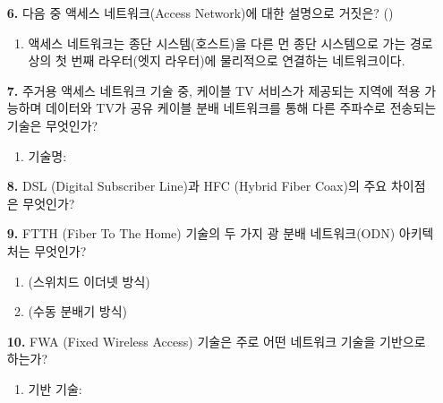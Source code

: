 \documentclass[a4paper, 10pt]{article}
\newcommand{\ansline}[1]{\underline{\hspace{#1}}}
\newcommand{\sectionbox}[1]{
  \vspace{0.5em}
  \noindent\fbox{\textbf{#1}}
  \vspace{0.5em}
}
\begin{document}
\begin{enumerate}[itemsep=2em, leftmargin=2em, label={}]
\item[] \sectionbox{II. 네트워크 엣지 및 접속 네트워크 (5문제)}

\item[\textbf{6.}] 다음 중 액세스 네트워크(Access Network)에 대한 설명으로 거짓은? (\hspace{1cm})
\begin{enumerate}[label={}, itemsep=0.3em, leftmargin=1.5em]
    \item 액세스 네트워크는 종단 시스템(호스트)을 다른 먼 종단 시스템으로 가는 경로상의 첫 번째 라우터(엣지 라우터)에 물리적으로 연결하는 네트워크이다.
\end{enumerate}

\item[\textbf{7.}] 주거용 액세스 네트워크 기술 중, 케이블 TV 서비스가 제공되는 지역에 적용 가능하며 데이터와 TV가 공유 케이블 분배 네트워크를 통해 다른 주파수로 전송되는 기술은 무엇인가?
\begin{enumerate}[label=\alph*., itemsep=0.3em, leftmargin=1.5em]
    \item 기술명: \ansline{5cm}
\end{enumerate}

\item[\textbf{8.}] DSL (Digital Subscriber Line)과 HFC (Hybrid Fiber Coax)의 주요 차이점은 무엇인가?

\item[\textbf{9.}] FTTH (Fiber To The Home) 기술의 두 가지 광 분배 네트워크(ODN) 아키텍처는 무엇인가?
\begin{enumerate}[label=\alph*., itemsep=0.3em, leftmargin=1.5em]
    \item \ansline{5cm} (스위치드 이더넷 방식)
    \item \ansline{5cm} (수동 분배기 방식)
\end{enumerate}

\item[\textbf{10.}] FWA (Fixed Wireless Access) 기술은 주로 어떤 네트워크 기술을 기반으로 하는가?
\begin{enumerate}[label=\alph*., itemsep=0.3em, leftmargin=1.5em]
    \item 기반 기술: \ansline{5cm}
\end{enumerate}



\end{enumerate}
\end{document}
